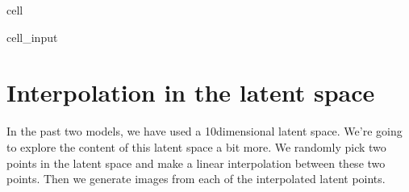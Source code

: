 \documentclass[letterpaper,10pt,english]{jupyterBook}
\begin{document}
\begin{sphinxuseclass}{cell}
\begin{sphinxVerbatimInput}
\begin{sphinxuseclass}{cell_input}
\end{sphinxuseclass}\end{sphinxVerbatimInput}

\end{sphinxuseclass}

\section{Interpolation in the latent space}
\label{\detokenize{notebooks/Tutorial4_Generative_Models/Tutorial4_Generative_Models_student:interpolation-in-the-latent-space}}
\sphinxAtStartPar
In the past two models, we have used a 10\sphinxhyphen{}dimensional latent space. We’re going to explore the content of this latent space a bit more. We randomly pick two points in the latent space and make a linear interpolation between these two points. Then we generate images from each of the interpolated latent points.
\end{document}
